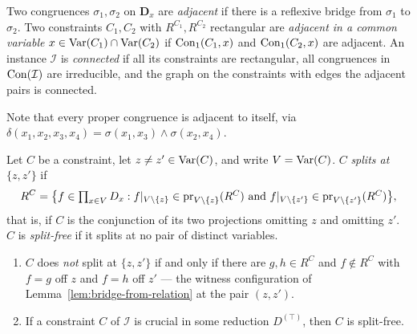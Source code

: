 \begin{definition}\label{def:connected}
Two congruences $\sigma_{1},\sigma_{2}$ on $\mathbf D_{x}$ are \emph{adjacent}
if there is a reflexive bridge from $\sigma_{1}$ to $\sigma_{2}$. Two
constraints $C_{1},C_{2}$ with $R^{C_{1}},R^{C_{2}}$ rectangular are
\emph{adjacent in a common variable $x\in\operatorname{Var}(C_{1})\cap\operatorname{Var}(C_{2})$} if
$\operatorname{Con}_1(C_{1},x)$ and $\operatorname{Con}_1(C_{2},x)$ are adjacent. An instance
$\mathcal I$ is \emph{connected} if all its constraints are rectangular, all
congruences in $\operatorname{Con}(\mathcal I)$ are irreducible, and the graph on the
constraints with edges the adjacent pairs is connected.
\end{definition}

Note that every proper congruence is adjacent to itself, via
$\delta(x_{1},x_{2},x_{3},x_{4})=\sigma(x_{1},x_{3})\wedge\sigma(x_{2},x_{4})$.

\begin{definition}\label{def:split}
Let $C$ be a constraint, let $z\neq z'\in\operatorname{Var}(C)$, and write $V=\operatorname{Var}(C)$.
$C$ \emph{splits at $\{z,z'\}$} if
\[
  R^{C}=\bigl\{f\in\textstyle\prod_{x\in V}D_{x}:
    f|_{V\setminus\{z\}}\in\operatorname*{pr}_{V\setminus\{z\}}(R^{C})
    \text{ and }
    f|_{V\setminus\{z'\}}\in\operatorname*{pr}_{V\setminus\{z'\}}(R^{C})\bigr\},
\]
that is, if $C$ is the conjunction of its two projections omitting $z$ and
omitting $z'$. $C$ is \emph{split-free} if it splits at no pair of distinct
variables.
\end{definition}

\begin{lemma}\label{lem:crucial-split-free}
\begin{enumerate}\alphlabels\tightlist
\item $C$ does \emph{not} split at $\{z,z'\}$ if and only if there are
  $g,h\in R^{C}$ and $f\notin R^{C}$ with $f=g$ off $z$ and $f=h$ off $z'$
  --- the witness configuration of Lemma~\ref{lem:bridge-from-relation} at
  the pair $(z,z')$.
\item If a constraint $C$ of $\mathcal I$ is crucial in some reduction
  $D^{(\top)}$, then $C$ is split-free.
\end{enumerate}
\end{lemma}

